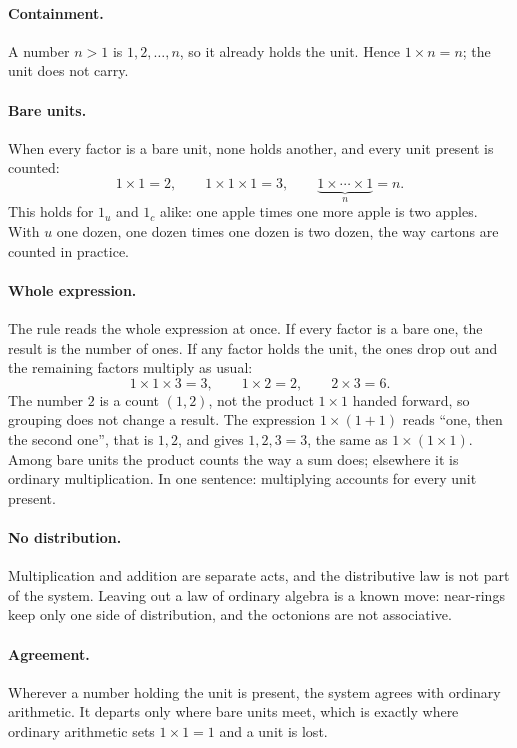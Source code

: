 \documentclass[11pt]{article}
\begin{document}
\paragraph{Containment.} A number $n>1$ is $1,2,\dots,n$, so it already holds the unit. Hence $1\times n = n$; the unit does not carry.

\paragraph{Bare units.} When every factor is a bare unit, none holds another, and every unit present is counted:
\[ 1\times1 = 2,\qquad 1\times1\times1 = 3,\qquad \underbrace{1\times\cdots\times1}_{n} = n. \]
This holds for $1_u$ and $1_c$ alike: one apple times one more apple is two apples. With $u$ one dozen, one dozen times one dozen is two dozen, the way cartons are counted in practice.

\paragraph{Whole expression.} The rule reads the whole expression at once. If every factor is a bare one, the result is the number of ones. If any factor holds the unit, the ones drop out and the remaining factors multiply as usual:
\[ 1\times1\times3 = 3,\qquad 1\times2 = 2,\qquad 2\times3 = 6. \]
The number $2$ is a count $(1,2)$, not the product $1\times1$ handed forward, so grouping does not change a result. The expression $1\times(1+1)$ reads ``one, then the second one'', that is $1,2$, and gives $1,2,3 = 3$, the same as $1\times(1\times1)$. Among bare units the product counts the way a sum does; elsewhere it is ordinary multiplication. In one sentence: multiplying accounts for every unit present.

\paragraph{No distribution.} Multiplication and addition are separate acts, and the distributive law is not part of the system. Leaving out a law of ordinary algebra is a known move: near-rings keep only one side of distribution, and the octonions are not associative.

\paragraph{Agreement.} Wherever a number holding the unit is present, the system agrees with ordinary arithmetic. It departs only where bare units meet, which is exactly where ordinary arithmetic sets $1\times1 = 1$ and a unit is lost.
\end{document}
